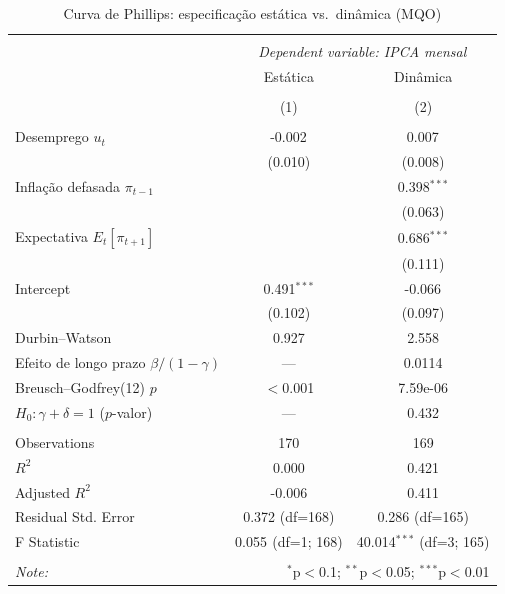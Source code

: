 \begin{table}[!htbp] \centering
  \caption{Curva de Phillips: especificação estática vs.\ dinâmica (MQO)}
\begin{tabular}{@{\extracolsep{5pt}}lcc}
\\[-1.8ex]\hline
\hline \\[-1.8ex]
& \multicolumn{2}{c}{\textit{Dependent variable: IPCA mensal}} \
\cr \cline{2-3}
\\[-1.8ex] & \multicolumn{1}{c}{Estática} & \multicolumn{1}{c}{Dinâmica}  \\
\\[-1.8ex] & (1) & (2) \\
\hline \\[-1.8ex]
 Desemprego $u_t$ & -0.002$^{}$ & 0.007$^{}$ \\
& (0.010) & (0.008) \\
 Inflação defasada $\pi_{t-1}$ & & 0.398$^{***}$ \\
& & (0.063) \\
 Expectativa $E_t[\pi_{t+1}]$ & & 0.686$^{***}$ \\
& & (0.111) \\
 Intercept & 0.491$^{***}$ & -0.066$^{}$ \\
& (0.102) & (0.097) \\
 Durbin--Watson & 0.927 & 2.558 \\
 Efeito de longo prazo $\beta/(1-\gamma)$ & --- & 0.0114 \\
 Breusch--Godfrey(12) $p$ & $<$0.001 & 7.59e-06 \\
 $H_0\!: \gamma+\delta=1$ ($p$-valor) & --- & 0.432 \\
\hline \\[-1.8ex]
 Observations & 170 & 169 \\
 $R^2$ & 0.000 & 0.421 \\
 Adjusted $R^2$ & -0.006 & 0.411 \\
 Residual Std. Error & 0.372 (df=168) & 0.286 (df=165) \\
 F Statistic & 0.055$^{}$ (df=1; 168) & 40.014$^{***}$ (df=3; 165) \\
\hline
\hline \\[-1.8ex]
\textit{Note:} & \multicolumn{2}{r}{$^{*}$p$<$0.1; $^{**}$p$<$0.05; $^{***}$p$<$0.01} \\
\end{tabular}
\end{table}